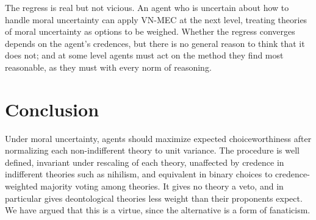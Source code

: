 \documentclass{situationist-preprint}
\begin{document}
\begin{reply}
The regress is real but not vicious. An agent who is uncertain about how to handle moral uncertainty can apply VN-MEC at the next level, treating theories of moral uncertainty as options to be weighed. Whether the regress converges depends on the agent's credences, but there is no general reason to think that it does not; and at some level agents must act on the method they find most reasonable, as they must with every norm of reasoning.
\end{reply}

\section{Conclusion}

Under moral uncertainty, agents should maximize expected choiceworthiness after normalizing each non-indifferent theory to unit variance. The procedure is well defined, invariant under rescaling of each theory, unaffected by credence in indifferent theories such as nihilism, and equivalent in binary choices to credence-weighted majority voting among theories. It gives no theory a veto, and in particular gives deontological theories less weight than their proponents expect. We have argued that this is a virtue, since the alternative is a form of fanaticism.
\end{document}
